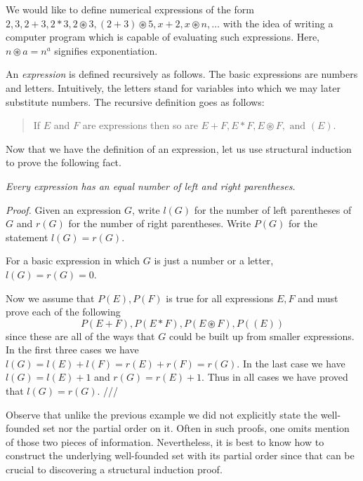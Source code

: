 \begin{eg}\label{ArithExpr} We would like to define numerical
    expressions of the form $2,3, 2+3, 2\ast 3, 2\circledast 3,
    (2+3)\circledast 5, x+2, x\circledast n, \dots $ with the idea of
    writing a computer program which is capable of evaluating such
    expressions. Here, $n\circledast a = n^a$ signifies
    exponentiation.

    An \emph{expression} is defined recursively as follows. The basic
    expressions are numbers and letters. Intuitively, the letters
    stand for variables into which we may later substitute numbers.
    The recursive definition goes as follows:

    \begin{quote} If $E$ and $F$ are expressions then so are $E+F,
        E\ast F, E\circledast F, \text{ and } (E).$
    \end{quote}


    Now that we have the definition of an expression, let us use
    structural induction to prove the following fact.

    \bigskip

    \noindent \emph{Every expression has an equal number of left and
    right parentheses.}

    \noindent \emph{Proof.} Given an expression $G$, write $l(G)$ for
    the number of left parentheses of $G$ and $r(G)$ for the number of
    right parentheses. Write $P(G)$ for the statement $l(G) = r(G)$.

    For a basic expression in which $G$ is just a number or a letter,
    $l(G)=r(G)=0$.

    Now we assume that $P(E), P(F)$ is true for all expressions $E,F$
    and must prove each of the following \[P(E+F), P(E\ast F), P(E
    \circledast F), P( ( E ) )  \] since these are all of the ways
    that $G$ could be built up from smaller expressions. In the first
    three cases we have $l(G) = l(E)+l(F) = r(E)+r(F) = r(G)$. In the
    last case we have $l(G) = l(E)+1$ and $r(G) = r(E)+1$. Thus in all
    cases we have proved that $l(G)=r(G)$. ///

    Observe that unlike the previous example we did not explicitly
    state the well-founded set nor the partial order on it. Often in
    such proofs, one omits mention of those two pieces of information.
    Nevertheless, it is best to know how to construct the underlying
    well-founded set with its partial order since that can be crucial
    to discovering a structural induction proof.
\end{eg}

